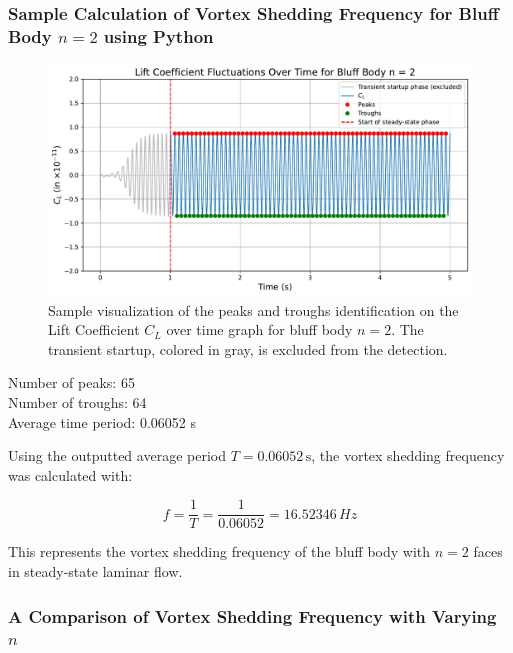 \subsubsection{Sample Calculation of Vortex Shedding Frequency for Bluff Body $n=2$ using Python}

\begin{figure}[H]
	\centering
	\includegraphics[width=\textwidth]{images/2face_graph_sample_Calc}
	\caption{Sample visualization of the peaks and troughs identification on the Lift Coefficient $C_L$ over time graph for bluff body $n=2$. The transient startup, colored in gray, is excluded from the detection.}
	\label{fig:2FaceGraphSampleCalc} 
\end{figure}

\begin{tcolorbox}[title=Python Output,fonttitle=\bfseries,
	colframe=black!75!white,colback=gray!10!white,boxrule=0.5pt,
	fontupper=\ttfamily]
	Number of peaks:    65 \\
	Number of troughs:  64 \\
	
	Average time period: 0.06052 s \\
\end{tcolorbox}

Using the outputted average period \( T = 0.06052 \, \text{s} \), the vortex shedding frequency was calculated with:

\[
f = \frac{1}{T} = \frac{1}{0.06052} = 16.52346 \, Hz
\]

This represents the vortex shedding frequency of the bluff body with \( n = 2 \) faces in steady-state laminar flow.

\subsubsection{A Comparison of Vortex Shedding Frequency with Varying $n$}


